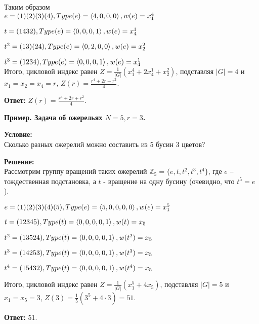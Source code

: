 Таким образом\\
$e = (1)(2)(3)(4), \space Type(e) = \left< 4, 0, 0, 0\right>, \space w(e) = x_{1}^{4}$

$t = (1432), \space Type(e) = \left< 0, 0, 0, 1\right>, \space w(e) = x_{4}^{1}$

$t^{2} = (13)(24), \space Type(e) = \left< 0, 2, 0, 0\right>, \space w(e) = x_{2}^{2}$

$t^{3} = (1234), \space Type(e) = \left< 0, 0, 0, 1\right>, \space w(e) = x_{4}^{1}$\\

Итого, цикловой индекс равен $Z = \frac{1}{|G|} (x_{1}^{4} + 2x_{4}^{1} + x_{2}^{2})$, подставляя $|G| = 4$ и $x_{1} = x_{2} = x_{4} = r$, $Z(r) = \frac{r^{4}+2r+r^{2}}{4}$.

\textbf{Ответ:} $Z(r) = \frac{r^{4}+2r+r^{2}}{4}$.


\textbf{Пример. Задача об ожерельях $N = 5, r = 3$.}

\textbf{Условие:}\\
Сколько разных ожерелий можно составить из 5 бусин 3 цветов?

\textbf{Решение:}\\
Рассмотрим группу вращений таких ожерелий $\mathbb{Z}_{5} = \{e, t, t^{2}, t^{3}, t^{4}\}$, где $e$ -- тождественная подстановка, а $t$ - вращение на одну бусину (очевидно, что $t^5 = e$).

$e = (1)(2)(3)(4)(5), \space Type(e) = \left< 5, 0, 0, 0, 0\right>, \space w(e) = x_{1}^{5}$

$t = (12345), \space Type(t) = \left< 0, 0, 0, 0, 1\right>, \space w(t) = x_{5}$

$t^2 = (13524), \space Type(t) = \left< 0, 0, 0, 0, 1\right>, \space w(t^2) = x_{5}$

$t^3 = (14253), \space Type(t) = \left< 0, 0, 0, 0, 1\right>, \space w(t^3) = x_{5}$

$t^4 = (15432), \space Type(t) = \left< 0, 0, 0, 0, 1\right>, \space w(t^4) = x_{5}$

Итого, цикловой индекс равен $Z = \frac{1}{|G|} (x_{1}^{5} + 4x_{5})$, подставляя $|G| = 5$ и $x_{1} = x_{5} = 3$, $Z(3) = \frac{1}{5} (3^5 + 4 \cdot 3) = 51$.

\textbf{Ответ:} 51.
